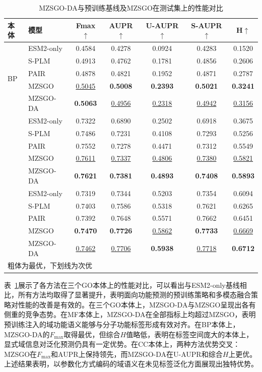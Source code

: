 \begin{table}[htbp]
\centering
\caption{MZSGO-DA与预训练基线及MZSGO在测试集上的性能对比}
\label{tab:mzsgo_da_comparison}
\small
\begin{tabular}{llccccc}
\toprule
本体 & 模型 & Fmax$\uparrow$ & AUPR$\uparrow$ & U-AUPR$\uparrow$ & S-AUPR$\uparrow$ & H$\uparrow$ \\
\midrule
\multirow{5}{*}{BP}
 & ESM2-only & 0.4584 & 0.4278 & 0.0924 & 0.4283 & 0.1520 \\
 & S-PLM & 0.4913 & 0.4762 & 0.1781 & 0.4856 & 0.2606 \\
 & PAIR & 0.4878 & 0.4821 & 0.1952 & 0.4871 & 0.2787 \\
 & MZSGO & \underline{0.5045} & \textbf{0.5008} & \textbf{0.2393} & \textbf{0.5021} & \textbf{0.3241} \\
 & MZSGO-DA & \textbf{0.5063} & \underline{0.4956} & \underline{0.2318} & \underline{0.4942} & \underline{0.3156} \\
\addlinespace[5pt]
\multirow{5}{*}{MF}
 & ESM2-only & 0.7322 & 0.6890 & 0.2502 & 0.6918 & 0.3675 \\
 & S-PLM & 0.7486 & 0.7231 & 0.4108 & 0.7293 & 0.5256 \\
 & PAIR & 0.7552 & 0.7278 & 0.4471 & 0.7312 & 0.5549 \\
 & MZSGO & \underline{0.7611} & \underline{0.7337} & \underline{0.4806} & \underline{0.7380} & \underline{0.5821} \\
 & MZSGO-DA & \textbf{0.7621} & \textbf{0.7381} & \textbf{0.4893} & \textbf{0.7408} & \textbf{0.5893} \\
\addlinespace[5pt]
\multirow{5}{*}{CC}
 & ESM2-only & 0.7319 & 0.7344 & 0.5203 & 0.7354 & 0.6094 \\
 & S-PLM & 0.7403 & 0.7586 & 0.5318 & 0.7621 & 0.6265 \\
 & PAIR & 0.7392 & 0.7648 & 0.5571 & 0.7662 & 0.6451 \\
 & MZSGO & \textbf{0.7470} & \textbf{0.7726} & \underline{0.5862} & \textbf{0.7733} & \underline{0.6669} \\
 & MZSGO-DA & \underline{0.7462} & \underline{0.7706} & \textbf{0.5938} & \underline{0.7718} & \textbf{0.6712} \\
\bottomrule
\multicolumn{7}{l}{\vspace{0.2em}\footnotesize 粗体为最优，下划线为次优} \\
\end{tabular}
\end{table}

表~\ref{tab:mzsgo_da_comparison}展示了各方法在三个GO本体上的性能对比，可以看出与ESM2-only基线相比，所有方法均取得了显著提升，表明面向功能预测的预训练策略和多模态融合策略对性能的改善是有效的。在三个GO本体上，MZSGO-DA与MZSGO呈现出各有侧重的竞争态势。在MF本体上，MZSGO-DA在全部指标上均超过MZSGO，表明预训练注入的域功能语义能够与分子功能标签形成有效对齐。在BP本体上，MZSGO-DA的$F_{\max}$取得最优，但综合$H$值略低，表明在标签空间庞大的本体上，显式域信息对泛化预测仍具有一定优势。在CC本体上，两种方法优势交叉：MZSGO在$F_{\max}$和AUPR上保持领先，而MZSGO-DA在U-AUPR和综合$H$上更优。上述结果表明，以参数化方式编码的域语义在未见标签泛化方面展现出独特优势。

